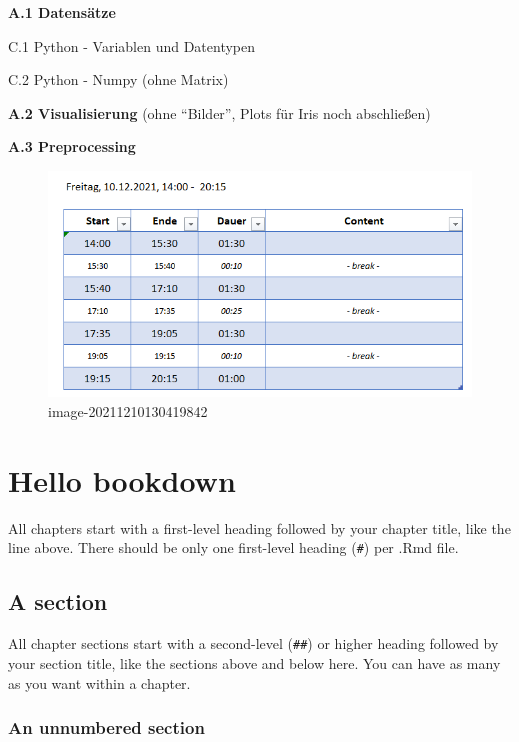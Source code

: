 \documentclass[
]{book}
\theoremstyle{definition}
\theoremstyle{definition}
\theoremstyle{definition}
\theoremstyle{definition}
\theoremstyle{remark}
\begin{document}
\textbf{A.1 Datensätze}

C.1 Python - Variablen und Datentypen

C.2 Python - Numpy (ohne Matrix)

\textbf{A.2 Visualisierung} (ohne ``Bilder'', Plots für Iris noch abschließen)

\textbf{A.3 Preprocessing}

\begin{figure}
\centering
\includegraphics{assets/README.assets/image-20211210130419842.png}
\caption{image-20211210130419842}
\end{figure}

\hypertarget{hello-bookdown}{%
\chapter{Hello bookdown}\label{hello-bookdown}}

All chapters start with a first-level heading followed by your chapter title, like the line above. There should be only one first-level heading (\texttt{\#}) per .Rmd file.

\hypertarget{a-section}{%
\section{A section}\label{a-section}}

All chapter sections start with a second-level (\texttt{\#\#}) or higher heading followed by your section title, like the sections above and below here. You can have as many as you want within a chapter.

\hypertarget{an-unnumbered-section}{%
\subsection*{An unnumbered section}\label{an-unnumbered-section}}
\end{document}
